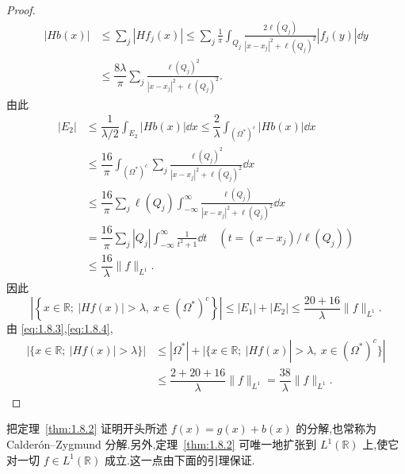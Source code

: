 \begin{proof}
\begin{align*}
|Hb(x)| &\leq \displaystyle\sum_{j}|Hf_{j}(x)| \leq \sum_{j}\frac{1}{\pi}\int_{Q_{j}}\frac{2\ell(Q_{j})}{|x - x_{j}|^{2} + \ell(Q_{j})^{2}}|f_{j}(y)|\dd y \\
&\leq \dfrac{8\lambda}{\pi}\displaystyle\sum_{j}\frac{\ell(Q_{j})^{2}}{|x - x_{j}|^{2} + \ell(Q_{j})^{2}}.
\end{align*}
由此
\begin{align*}
|E_{2}| &\leq \dfrac{1}{\lambda/2}\displaystyle\int_{E_{2}}|Hb(x)|\dd x \leq \dfrac{2}{\lambda}\int_{(\Omega^{*})^{c}}|Hb(x)|\dd x \\
\quad &\leq \dfrac{16}{\pi}\displaystyle\int_{(\Omega^{*})^{c}}\sum_{j}\frac{\ell(Q_{j})^{2}}{|x - x_{j}|^{2} + \ell(Q_{j})^{2}}\dd x \\
\quad &\leq \dfrac{16}{\pi}\displaystyle\sum_{j}\ell(Q_{j})\int_{-\infty}^{\infty}\frac{\ell(Q_{j})}{|x - x_{j}|^{2} + \ell(Q_{j})^{2}}\dd x \\
\quad &= \dfrac{16}{\pi}\displaystyle\sum_{j}|Q_{j}|\int_{-\infty}^{\infty}\frac{1}{t^{2} + 1}\dd t \quad (t = (x - x_{j})/\ell(Q_{j})) \\
\quad &\leq \dfrac{16}{\lambda}\| f \|_{L^{1}}.
\end{align*}
因此
\begin{equation}\tag{1.8.4}
\left|\left\{x \in \mathbb{R};\ |Hf(x)| > \lambda,\ x \in (\Omega^{*})^{c}\right\}\right| \leq |E_{1}| + |E_{2}| \leq \frac{20 + 16}{\lambda}\| f \|_{L^{1}}.
\label{eq:1.8.4}\end{equation}
由 \eqref{eq:1.8.3},\eqref{eq:1.8.4},
\begin{align*}
|\{x \in \mathbb{R};\ |Hf(x)| > \lambda\}| & \leq |\Omega^{*}| + |\{x \in \mathbb{R};\ |Hf(x)| > \lambda,\ x \in (\Omega^{*})^{c}\}| \\
& \leq \dfrac{2 + 20 + 16}{\lambda}\| f \|_{L^{1}} = \dfrac{38}{\lambda}\| f \|_{L^{1}}.
\end{align*}
\end{proof}

\begin{note}\label{note:1.8.3}
把定理~\ref{thm:1.8.2} 证明开头所述 $f(x) = g(x) + b(x)$ 的分解,也常称为 Calderón--Zygmund 分解.另外,定理~\ref{thm:1.8.2} 可唯一地扩张到 $L^{1}(\mathbb{R})$ 上,使它对一切 $f \in L^{1}(\mathbb{R})$ 成立.这一点由下面的引理保证.
\end{note}

